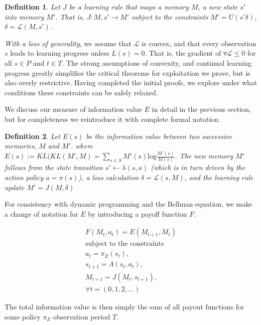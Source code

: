 \documentclass[9pt,twocolumn,twoside]{pnas-new}
\newtheorem{definition}{Definition}
\begin{document}
\begin{definition}
    Let $J$ be a learning rule that maps a memory $M$, a new state $s'$ into memory $M'$. That is, $J : M, s' \rightarrow M'$ subject to the constraints  $M' = U(s' \delta)$, $\delta = \mathcal{L}(M, s')$.
\end{definition}

\textit{With a loss of generality}, we assume that $\mathcal{L}$ is convex, and that every observation $s$ leads to learning progress unless $L(s) = 0$. That is, the gradient of $\triangledown \mathcal{L} \leq 0$ for all $s \in P$ and $t \in T$. The strong assumptions of convexity, and continual learning progress greatly simplifies the critical theorems for exploitation we prove, but is also overly restrictive. Having completed the initial proofs, we explore under what conditions these constraints can be safely relaxed.

We discuss our measure of information value $E$ in detail in the previous section, but for completeness we reintroduce it with complete formal notation.

\begin{definition}
    Let $E(s)$ be the information value between two successive memories, $M$ and $M'$. where $E(s) := KL(KL(M', M) = \sum_{s \in S} M'(s) \text{log} \frac{M'(s)}{M(s)} $. The new memory $M'$ follows from the state transition $s' \leftarrow \lambda (s, a)$ (which is in turn driven by the action policy $a = \pi(s)$), a loss calculation $\delta = \mathcal{L}(s, M)$, and the learning rule update $M' = J(M, \delta)$
\end{definition}

For consistency with dynamic programming and the Bellman equation, we make a change of notation for $E$ by introducing a payoff function $F$.

\begin{equation}
    \begin{split} \label{eq:V}
    F(M_t, a_t) = E(M_{t+1}, M_{t})\\
    \text{subject to the constraints} \\
    a_t = \pi_E(s_t), \\
    s_{t+1} = \Lambda(s_t, a_t),\\ 
    M_{t+1} = J(M_t, s_{t+1}),\\ 
    \forall t = (0,1,2,\ldots)
    \end{split} 
\end{equation}

The total information value is then simply the sum of all payout functions for some policy $\pi_E$ observation period $T$. 
\end{document}
